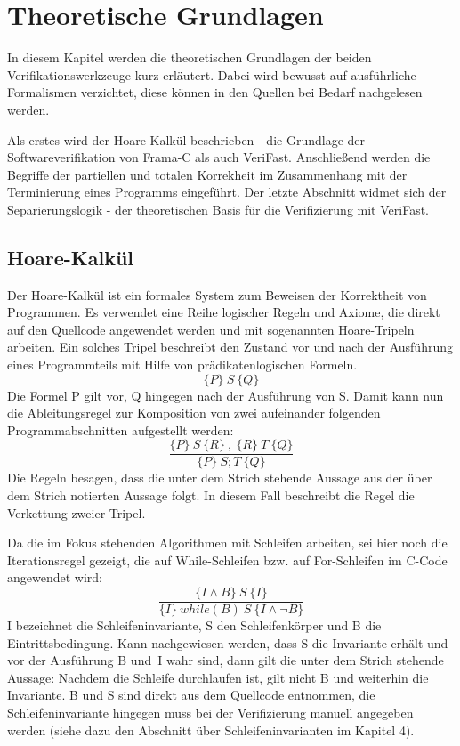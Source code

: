 ﻿
\chapter{Theoretische Grundlagen}

In diesem Kapitel werden die theoretischen Grundlagen der beiden Verifikationswerkzeuge kurz erläutert. Dabei wird bewusst
auf ausführliche Formalismen verzichtet, diese können in den Quellen bei Bedarf nachgelesen werden.

Als erstes wird der Hoare-Kalkül beschrieben - die Grundlage der Softwareverifikation von Frama-C als auch VeriFast.
Anschließend werden die Begriffe der partiellen und totalen Korrekheit im Zusammenhang mit der Terminierung eines Programms
eingeführt. Der letzte Abschnitt widmet sich der Separierungslogik - der theoretischen Basis für die Verifizierung
mit VeriFast.

\section{Hoare-Kalkül}

Der Hoare-Kalkül ist ein formales System zum Beweisen der Korrektheit von Programmen. Es verwendet eine Reihe logischer
Regeln und Axiome, die direkt auf den Quellcode angewendet werden und mit sogenannten Hoare-Tripeln arbeiten. Ein solches
Tripel beschreibt den Zustand vor und nach der Ausführung eines Programmteils mit Hilfe von prädikatenlogischen
Formeln.
\begin{displaymath}
\{P\} \: S \: \{Q\}
\end{displaymath}
Die Formel P gilt vor, Q hingegen nach der Ausführung von S. Damit kann nun die Ableitungsregel zur Komposition von
zwei aufeinander folgenden Programmabschnitten aufgestellt werden:
\begin{displaymath}
\frac{\{P\} \:S\: \{R\} \:, \: \{R\} \: T \: \{Q\}}{\{P\}\: S; T \: \{Q\}}
\end{displaymath}
Die Regeln besagen, dass die unter dem Strich stehende Aussage aus der über dem Strich notierten Aussage folgt. In diesem
Fall beschreibt die Regel die Verkettung zweier Tripel.

Da die im Fokus stehenden Algorithmen mit Schleifen arbeiten, sei hier noch die Iterationsregel gezeigt, die auf While-Schleifen
bzw. auf For-Schleifen im C-Code angewendet wird: 
\begin{displaymath}
\frac{\{I \land B\} \:S\: \{I\}}{\{I\}\: while(B)\: S\: \{I \land \neg B\}}
\end{displaymath}
I bezeichnet die Schleifeninvariante, S den Schleifenkörper und B die Eintrittsbedingung. Kann nachgewiesen werden,
dass S die Invariante erhält und vor der Ausführung B und~I wahr sind, dann gilt die unter dem Strich stehende Aussage: Nachdem
die Schleife durchlaufen ist, gilt nicht B und weiterhin die Invariante. B und S sind direkt aus dem Quellcode entnommen, 
die Schleifeninvariante hingegen muss bei der Verifizierung  manuell angegeben werden (siehe dazu den Abschnitt über 
Schleifeninvarianten im Kapitel 4).

